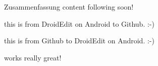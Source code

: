 \Large{Zusammenfassung} 
\newline
content following soon!

this is from DroidEdit on Android to Github. :-)

this is from Github to DroidEdit on Android. :-)

works really great! 